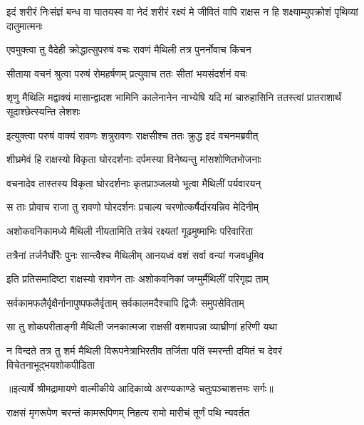 \threelineshloka
{इदं शरीरं निःसंज्ञं बन्ध वा घातयस्व वा}
{नेदं शरीरं रक्ष्यं मे जीवितं वापि राक्षस}
{न हि शक्ष्याम्युपक्रोशं पृथिव्यां दातुमात्मनः} %

\twolineshloka
{एवमुक्त्वा तु वैदेही क्रोद्धात्सुपरुषं वचः}
{रावणं मैथिली तत्र पुनर्नोवाच किंचन} %

\twolineshloka
{सीताया वचनं श्रुत्वा परुषं रोमहर्षणम्}
{प्रत्युवाच ततः सीतां भयसंदर्शनं वचः} %

\threelineshloka
{शृणु मैथिलि मद्वाक्यं मासान्द्वादश भामिनि}
{कालेनानेन नाभ्येषि यदि मां चारुहासिनि}
{ततस्त्वां प्रातराशार्थं सूदाश्छेत्स्यन्ति लेशशः} %

\twolineshloka
{इत्युक्त्वा परुषं वाक्यं रावणः शत्रुरावणः}
{राक्षसीश्च ततः क्रुद्ध इदं वचनमब्रवीत्} %

\twolineshloka
{शीघ्रमेवं हि राक्षस्यो विकृता घोरदर्शनाः}
{दर्पमस्या विनेष्यन्तु मांसशोणितभोजनाः} %

\twolineshloka
{वचनादेव तास्तस्य विकृता घोरदर्शनाः}
{कृतप्राञ्जलयो भूत्वा मैथिलीं पर्यवारयन्} %

\twolineshloka
{स ताः प्रोवाच राजा तु रावणो घोरदर्शनः}
{प्रचाल्य चरणोत्कर्षैर्दारयन्निव मेदिनीम्} %

\twolineshloka
{अशोकवनिकामध्ये मैथिली नीयतामिति}
{तत्रेयं रक्ष्यतां गूढमुष्माभिः परिवारिता} %

\twolineshloka
{तत्रैनां तर्जनैर्घोरैः पुनः सान्त्वैश्च मैथिलीम्}
{आनयध्वं वशं सर्वा वन्यां गजवधूमिव} %

\twolineshloka
{इति प्रतिसमादिष्टा राक्षस्यो रावणेन ताः}
{अशोकवनिकां जग्मुर्मैथिलीं परिगृह्य ताम्} %

\twolineshloka
{सर्वकामफलैर्वृक्षैर्नानापुष्पफलैर्वृताम्}
{सर्वकालमदैश्चापि द्विजैः समुपसेविताम्} %

\twolineshloka
{सा तु शोकपरीताङ्गी मैथिली जनकात्मजा}
{राक्षसी वशमापन्ना व्याघ्रीणां हरिणी यथा} %

\fourlineindentedshloka
{न विन्दते तत्र तु शर्म मैथिली}
{ विरूपनेत्राभिरतीव तर्जिता}
{पतिं स्मरन्ती दयितं च देवरं}
{ विचेतनाभूद्भयशोकपीडिता} %


{॥इत्यार्षे श्रीमद्रामायणे वाल्मीकीये आदिकाव्ये अरण्यकाण्डे चतुःपञ्चाशत्तमः सर्गः॥}


\twolineshloka
{राक्षसं मृगरूपेण चरन्तं कामरूपिणम्}
{निहत्य रामो मारीचं तूर्णं पथि न्यवर्तत} %

